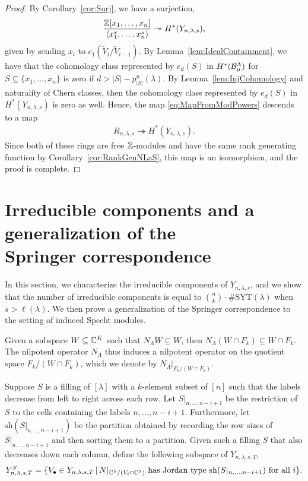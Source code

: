 \documentclass[12pt]{amsart}
\newcommand{\st}{\,|\,}
\newcommand{\la}{\lambda}
\newcommand{\SYT}{\mathrm{SYT}}
\begin{document}
\begin{proof}
By Corollary~\ref{cor:Surj}, we have a surjection,
\begin{align}\label{eq:MapFromModPowers}
\frac{\bZ[x_1,\dots, x_n]}{\langle x_1^s,\dots, x_n^s\rangle} \twoheadrightarrow H^*(Y_{n,\la,s}),
\end{align}
given by sending $x_i$ to $c_1(\widetilde V_i/\widetilde V_{i-1})$. By Lemma~\ref{lem:IdealContainment}, we have that the cohomology class represented by $e_d(S)$ in $H^*(\mathcal{B}_\mu^\Lambda)$ for $S\subseteq \{x_1,\dots, x_n\}$ is zero if $d>|S| - p^n_{|S|}(\la)$. By Lemma~\ref{lem:InjCohomology} and naturality of Chern classes, then the cohomology class represented by $e_d(S)$ in $H^*(Y_{n,\la,s})$ is zero as well. Hence, the map \eqref{eq:MapFromModPowers} descends to a map
\begin{align}
R_{n,\la,s} \twoheadrightarrow H^*(Y_{n,\la,s}).
\end{align}
Since both of these rings are free $\mathbb{Z}$-modules and have the same rank generating function by Corollary~\ref{cor:RankGenNLaS}, this map is an isomorphism, and the proof is complete.
\end{proof}





\section{Irreducible components and a generalization of the \\Springer correspondence}\label{sec:IrreducibleComponents}


In this section, we characterize the irreducible components of $Y_{n,\la,s}$, and we show that the number of irreducible components is equal to $\binom{n}{k}\cdot\#\SYT(\la)$ when $s>\ell(\la)$. We then prove a generalization of the Springer correspondence to the setting of induced Specht modules.


Given a subspace $W\subseteq \mathbb{C}^K$ such that $N_\Lambda W\subseteq W$, then $N_\Lambda(W\cap F_k)\subseteq W\cap F_k$. The nilpotent operator $N_\Lambda$ thus induces a nilpotent operator on the quotient space $F_k/(W\cap F_k)$, which we denote by $N_\Lambda|_{F_k/(W\cap F_k)}$.

Suppose $S$ is a filling of $[\lambda]$ with a $k$-element subset of $[n]$ such that the labels decrease from left to right across each row. Let $S|_{n,\dots, n-i+1}$ be the restriction of $S$ to the cells containing the labels $n,\dots, n-i+1$. Furthermore, let $\mathrm{sh}(S|_{n,\dots, n-i+1})$ be the partition obtained by recording the row sizes of $S|_{n,\dots, n-i+1}$ and then sorting them to a partition.
Given such a filling $S$ that also decreases down each column, define the following subspace of $Y_{n,\la,s,T}$,
\begin{align}
Y_{n,\la,s,T}^{S} = \{V_\bullet \in Y_{n,\la,s,T} \st N|_{\bC^\lambda/(V_i\cap \bC^\lambda)}\text{ has Jordan type }\mathrm{sh}(S|_{n,\dots,n-i+1})\text{ for all }i\}.
\end{align}
\end{document}
